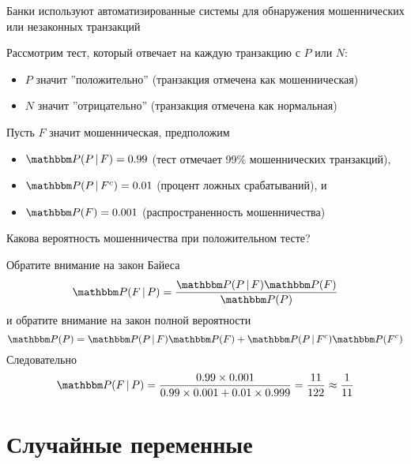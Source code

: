 \begin{frame}

    \vspace{1em}
    \Eg
    Банки используют автоматизированные системы для обнаружения мошеннических или 
    незаконных транзакций
    
    Рассмотрим тест, который отвечает на каждую транзакцию с $P$
    или $N$:
    \begin{itemize}
        \item $P$ значит ''положительно'' (транзакция отмечена как мошенническая)
        \item $N$ значит ''отрицательно'' (транзакция отмечена как нормальная)
    \end{itemize}
    
    Пусть $F$ значит мошенническая, предположим
    \begin{itemize}
        \item $\PP( P \given F) = 0.99$ (тест отмечает 99\% мошеннических транзакций),
        \item $\PP( P \given F^c ) = 0.01$ (процент ложных срабатываний), и
        \item $\PP( F ) = 0.001$  (распространенность мошенничества)
    \end{itemize}
\end{frame}

\begin{frame}

    \vspace{2em}
    Какова вероятность мошенничества при положительном тесте?
    
    Обратите внимание на закон Байеса
    $$
        \PP(F \,|\, P) = \frac{\PP(P \given F)\PP(F)}{\PP(P)}
    $$
    и обратите внимание на закон полной вероятности 
        $$
        \PP(P) = \PP(P \given F) \PP(F) + \PP(P \given F^c) \PP(F^c)
        $$
    Следовательно
    $$
        \PP(F \,|\, P) 
        = \frac{0.99 \times 0.001}{0.99 \times 0.001 + 0.01 \times 0.999}
        = \frac{11}{122}
        \approx \frac{1}{11}
    $$
    
\end{frame}

\section{Случайные переменные}

